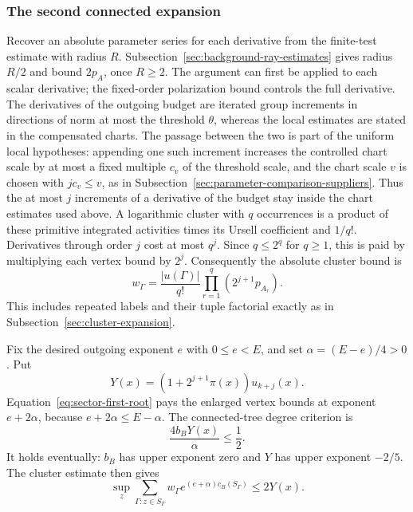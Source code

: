 \subsubsection{The second connected expansion}
Recover an absolute parameter series for each derivative from the
finite-test estimate with radius $R$. Subsection~\ref{sec:background-ray-estimates}
gives radius $R/2$ and bound $2p_A$, once $R\ge2$.
The argument can first be applied to each scalar derivative;
the fixed-order polarization bound controls the full derivative.
The derivatives of the outgoing budget are iterated group increments
in directions of norm at most the threshold $\theta$, whereas the
local estimates are stated in the compensated charts. The passage
between the two is part of the uniform local hypotheses: appending
one such increment increases the controlled chart scale by at most a
fixed multiple $c_v$ of the threshold scale, and the chart scale $v$
is chosen with $jc_v\le v$, as in
Subsection~\ref{sec:parameter-comparison-suppliers}. Thus the at most
$j$ increments of a derivative of the budget stay inside the chart
estimates used above.
A logarithmic cluster with $q$ occurrences is a product of these
primitive integrated activities times its Ursell coefficient
and $1/q!$. Derivatives through order $j$ cost at most $q^j$.
Since $q\le2^q$ for $q\ge1$, this is paid by multiplying each
vertex bound by $2^j$. Consequently the absolute cluster bound is
\[
       w_\Gamma=\frac{|u(\Gamma)|}{q!}
                           \prod_{r=1}^{q}(2^{j+1}p_{A_r}).
\]
This includes repeated labels and their tuple factorial exactly
as in Subsection~\ref{sec:cluster-expansion}.

Fix the desired outgoing exponent $e$ with $0\le e<E$, and set
$\alpha=(E-e)/4>0$. Put
\[
                   Y(x)=(1+2^{j+1}\pi(x))u_{k+j}(x).
\]
Equation~\eqref{eq:sector-first-root} pays the enlarged vertex
bounds at exponent $e+2\alpha$, because
$e+2\alpha\le E-\alpha$. The connected-tree degree criterion is
\[
                         \frac{4b_BY(x)}{\alpha}\le\frac12.
\]
It holds eventually: $b_B$ has upper exponent zero and $Y$ has
upper exponent $-2/5$. The cluster estimate then gives
\[
                \sup_z\sum_{\Gamma:z\in S_\Gamma}
                      w_\Gamma e^{(e+\alpha)c_B(S_\Gamma)}
                                                       \le2Y(x).
\]

